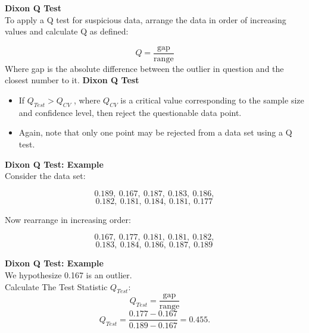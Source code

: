 \documentclass[a4paper,12pt]{article}
\begin{document}
\Large
\textbf{Dixon Q Test}\\
To apply a Q test for suspicious data, arrange the data in order of increasing values and calculate Q as defined:

\[ Q = \frac{\text{gap}}{\text{range}} \]
Where gap is the absolute difference between the outlier in question and the closest number to it. 
\Large
\textbf{Dixon Q Test}
\begin{itemize}
	\item 	If $Q_{Test} > Q_{CV}$ , where $Q_{CV}$ is a critical value corresponding to the sample size and confidence level, then reject the questionable data point. 
	\item Again, note that only one point may be rejected from a data set using a Q test.
\end{itemize}


\Large

\textbf{Dixon Q Test: Example}\\
Consider the data set:
\begin{framed}
	\[0.189,\ 0.167,\ 0.187,\ 0.183,\ 0.186,\]\[ 0.182,\ 0.181,\ 0.184,\ 0.181,\ 0.177 \,\]
\end{framed}
Now rearrange in increasing order:
\begin{framed}
	\[0.167,\ 0.177,\ 0.181,\ 0.181,\ 0.182,\]\[ 0.183,\ 0.184,\ 0.186,\ 0.187,\ 0.189 \, \]
\end{framed}
\Large
\textbf{Dixon Q Test: Example}\\
We hypothesize 0.167 is an outlier. \\ Calculate The Test Statistic $Q_{Test}$:
{
	\[ Q_{Test}=\frac{\text{gap}}{\text{range}}  \]
	\[ Q_{Test} 
	= \frac{0.177-0.167}{0.189-0.167}=0.455.\]
}
\end{document}
